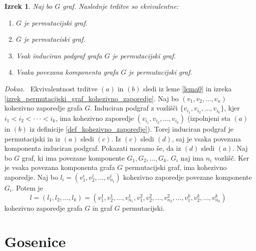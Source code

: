 \documentclass[a4paper, 12pt]{book}
\newtheorem{izrek}{Izrek}[chapter]
\newenvironment{dokaz}{\emph{Dokaz.}\ }{\hspace{\fill}{$\Box$}}
\begin{document}
\begin{izrek}
\label{izrek_ekvivalentne_trditve_permutacijski_graf}
    Naj bo $G$ graf. Naslednje trditve so ekvivalentne:
    \begin{enumerate}[label=(\alph*)]
        \item $G$ je permutacijski graf.
        \item $\overline{G}$ je permutaciski graf.
        \item Vsak induciran podgraf grafa $G$ je permutacijski graf.
        \item Vsaka povezana komponenta grafa $G$ je permutacijski graf.
    \end{enumerate}
\end{izrek}
\begin{dokaz}
    Ekvivalentnost trditve $(a)$ in $(b)$ sledi iz leme \ref{lema0} in izreka \ref{izrek_permutacijski_graf_kohezivno_zaporedje}. Naj bo $(v_1, v_2, ..., v_n)$ kohezivno zaporedje grafa $G$. Induciran podgraf z vozlišči $\{ v_{i_1}, v_{i_2}, ..., v_{i_k} \}$, kjer $i_1 < i_2 < \cdot\cdot\cdot < i_k$, ima kohezivno zaporedje $(v_{i_1}, v_{i_2}, ..., v_{i_k})$ (izpolnjeni sta $(a)$ in $(b)$ iz definicije \ref{def_kohezivno_zaporedje}). Torej induciran podgraf je permutacijski in iz $(a)$ sledi $(c)$. Iz $(c)$ sledi $(d)$, saj je vsaka povezana komponenta induciran podgraf. Pokazati moramo še, da iz $(d)$ sledi $(a)$. Naj bo $G$ graf, ki ima povezane komponente $G_1, G_2, ..., G_k$. $G_i$ naj ima $n_i$ vozlišč. Ker je vsaka povezana komponenta grafa $G$ permutacijski graf, ima kohezivno zaporedje. Naj bo $l_i = (v_1^i, v_2^i, ..., v_{n_i}^i)$ kohezivno zaporedje povezane komponente $G_i$. Potem je 
    \[
        l = (l_1, l_2, ..., l_k) = (v_1^1, v_2^1, ..., v_{n_1}^1, v_1^2, v_2^2, ..., v_{n_2}^2, ..., v_1^k, v_2^k, ..., v_{n_k}^k)
    \]
         kohezivno zaporedje grafa $G$ in graf $G$ permutacijski. 
\end{dokaz}

\section{ Gosenice }
\end{document}
